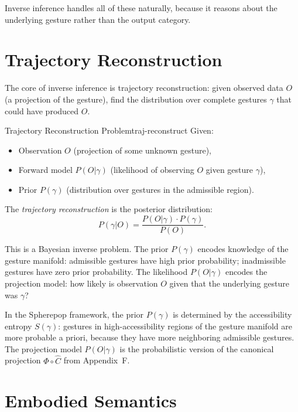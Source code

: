 Inverse inference handles all of these naturally, because it reasons
about the underlying gesture rather than the output category.

\section{Trajectory Reconstruction}

The core of inverse inference is trajectory reconstruction: given
observed data $O$ (a projection of the gesture), find the distribution
over complete gestures $\gamma$ that could have produced $O$.

\begin{definition}{Trajectory Reconstruction Problem}{traj-reconstruct}
  Given:
  \begin{itemize}
    \item Observation $O$ (projection of some unknown gesture),
    \item Forward model $P(O | \gamma)$ (likelihood of observing $O$
          given gesture $\gamma$),
    \item Prior $P(\gamma)$ (distribution over gestures in the
          admissible region).
  \end{itemize}
  The \emph{trajectory reconstruction} is the posterior distribution:
  \[
    P(\gamma | O) = \frac{P(O | \gamma) \cdot P(\gamma)}{P(O)}.
  \]
\end{definition}

This is a Bayesian inverse problem. The prior $P(\gamma)$ encodes
knowledge of the gesture manifold: admissible gestures have high
prior probability; inadmissible gestures have zero prior probability.
The likelihood $P(O | \gamma)$ encodes the projection model: how
likely is observation $O$ given that the underlying gesture was $\gamma$?

\begin{remark}
  In the Spherepop framework, the prior $P(\gamma)$ is determined by the
  accessibility entropy $S(\gamma)$: gestures in high-accessibility regions
  of the gesture manifold are more probable a priori, because they have
  more neighboring admissible gestures. The projection model
  $P(O | \gamma)$ is the probabilistic version of the canonical
  projection $\Phi \circ \hat{C}$ from Appendix~F.
\end{remark}

\section{Embodied Semantics}

